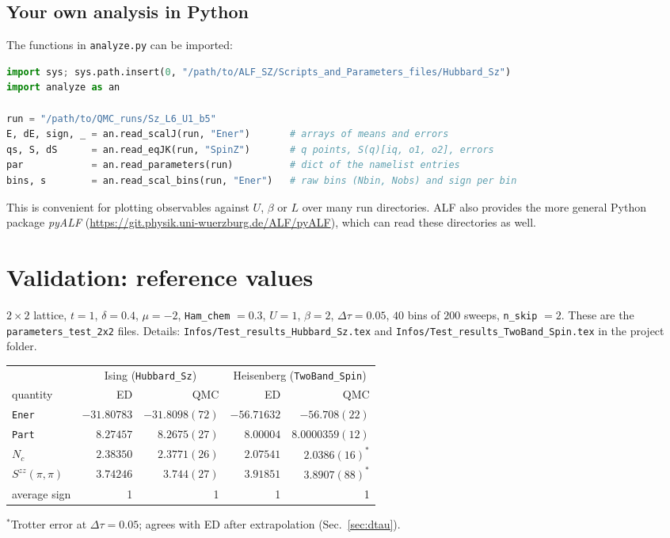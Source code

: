 \documentclass[11pt,a4paper]{article}
\newcommand{\f}[1]{\texttt{#1}}          %
\begin{document}
\subsection{Your own analysis in Python}
The functions in \f{analyze.py} can be imported:
\begin{lstlisting}[language=Python]
import sys; sys.path.insert(0, "/path/to/ALF_SZ/Scripts_and_Parameters_files/Hubbard_Sz")
import analyze as an

run = "/path/to/QMC_runs/Sz_L6_U1_b5"
E, dE, sign, _ = an.read_scalJ(run, "Ener")       # arrays of means and errors
qs, S, dS      = an.read_eqJK(run, "SpinZ")       # q points, S(q)[iq, o1, o2], errors
par            = an.read_parameters(run)          # dict of the namelist entries
bins, s        = an.read_scal_bins(run, "Ener")   # raw bins (Nbin, Nobs) and sign per bin
\end{lstlisting}
This is convenient for plotting observables against $U$, $\beta$ or $L$ over many run
directories. ALF also provides the more general Python package \emph{pyALF}
(\url{https://git.physik.uni-wuerzburg.de/ALF/pyALF}), which can read these directories as
well.

\section{Validation: reference values}
\label{sec:validation}

$2\times2$ lattice, $t=1$, $\delta=0.4$, $\mu=-2$, \f{Ham\_chem} $=0.3$, $U=1$, $\beta=2$,
$\Delta\tau=0.05$, $40$ bins of $200$ sweeps, \f{n\_skip} $=2$. These are the \f{parameters\_test\_2x2} files.
Details: \f{Infos/Test\_results\_Hubbard\_Sz.tex} and \f{Infos/Test\_results\_TwoBand\_Spin.tex}
in the project folder.

\begin{center}
\small
\begin{tabular}{lrrrr}
\toprule
 & \multicolumn{2}{c}{Ising (\f{Hubbard\_Sz})} & \multicolumn{2}{c}{Heisenberg (\f{TwoBand\_Spin})}\\
quantity & ED & QMC & ED & QMC \\
\midrule
\f{Ener}            & $-31.80783$ & $-31.8098(72)$ & $-56.71632$ & $-56.708(22)$ \\
\f{Part}            & $8.27457$   & $8.2675(27)$   & $8.00004$   & $8.0000359(12)$ \\
$N_c$               & $2.38350$   & $2.3771(26)$   & $2.07541$   & $2.0386(16)^{*}$ \\
$S^{zz}(\pi,\pi)$   & $3.74246$   & $3.744(27)$    & $3.91851$   & $3.8907(88)^{*}$ \\
average sign        & 1 & 1 & 1 & 1 \\
\bottomrule
\end{tabular}
\end{center}
$^{*}$Trotter error at $\Delta\tau=0.05$; agrees with ED after extrapolation
(Sec.~\ref{sec:dtau}).
\end{document}
